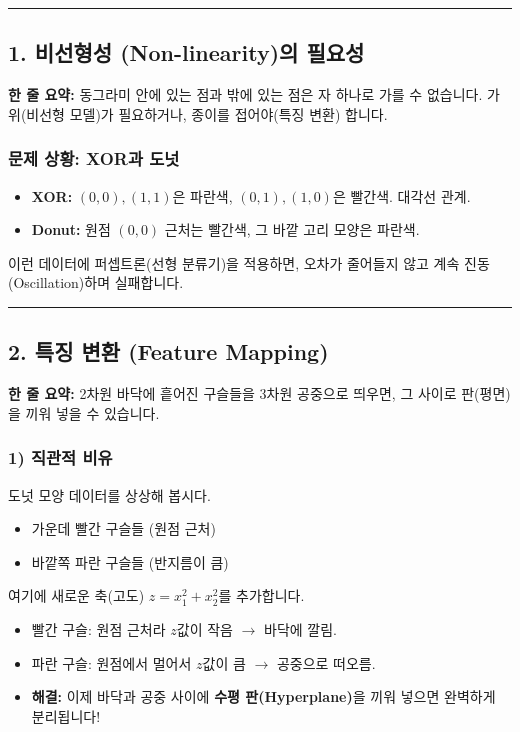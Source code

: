\documentclass[11pt,a4paper]{book}
\theoremstyle{definition}
\begin{document}
\vspace{0.5cm}\hrule\vspace{0.5cm}

\subsection{1. 비선형성 (Non-linearity)의 필요성}


\begin{conceptbox}[title={개념 1: 직선의 한계}]
\textbf{한 줄 요약:} 동그라미 안에 있는 점과 밖에 있는 점은 자 하나로 가를 수 없습니다. 가위(비선형 모델)가 필요하거나, 종이를 접어야(특징 변환) 합니다.
\end{conceptbox}

\subsubsection*{문제 상황: XOR과 도넛}
\begin{itemize}
    \item \textbf{XOR:} $(0,0), (1,1)$은 파란색, $(0,1), (1,0)$은 빨간색. 대각선 관계.
    \item \textbf{Donut:} 원점 $(0,0)$ 근처는 빨간색, 그 바깥 고리 모양은 파란색.
\end{itemize}
이런 데이터에 퍼셉트론(선형 분류기)을 적용하면, 오차가 줄어들지 않고 계속 진동(Oscillation)하며 실패합니다.

\vspace{0.5cm}\hrule\vspace{0.5cm}

\subsection{2. 특징 변환 (Feature Mapping)}

\begin{conceptbox}[title={개념 2: 차원 띄우기 (Lifting)}]
\textbf{한 줄 요약:} 2차원 바닥에 흩어진 구슬들을 3차원 공중으로 띄우면, 그 사이로 판(평면)을 끼워 넣을 수 있습니다.
\end{conceptbox}

\subsubsection*{1) 직관적 비유}
도넛 모양 데이터를 상상해 봅시다.
\begin{itemize}
    \item 가운데 빨간 구슬들 (원점 근처)
    \item 바깥쪽 파란 구슬들 (반지름이 큼)
\end{itemize}
여기에 새로운 축(고도) $z = x_1^2 + x_2^2$를 추가합니다.
\begin{itemize}
    \item 빨간 구슬: 원점 근처라 $z$값이 작음 $\rightarrow$ 바닥에 깔림.
    \item 파란 구슬: 원점에서 멀어서 $z$값이 큼 $\rightarrow$ 공중으로 떠오름.
    \item \textbf{해결:} 이제 바닥과 공중 사이에 \textbf{수평 판(Hyperplane)}을 끼워 넣으면 완벽하게 분리됩니다!
\end{itemize}
\end{document}
